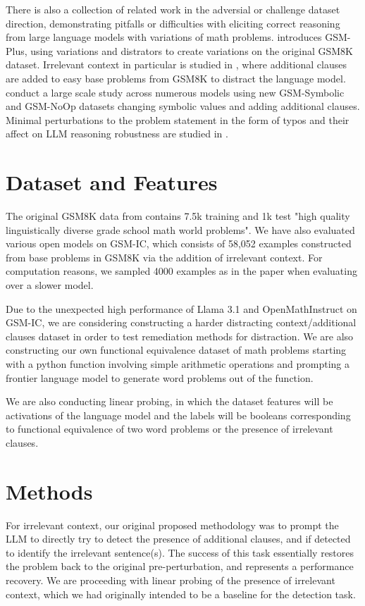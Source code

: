 \documentclass{article}
\begin{document}
There is also a collection of related work in the adversial or challenge dataset direction, demonstrating pitfalls or difficulties with eliciting correct reasoning from large language models with variations of math problems. \citep{li} introduces GSM-Plus, using variations and distrators to create variations on the original GSM8K dataset. Irrelevant context in particular is studied in \citep{shi}, where additional clauses are added to easy base problems from GSM8K to distract the language model. \citep{mirzadeh} conduct a large scale study across numerous models using new GSM-Symbolic and GSM-NoOp datasets changing symbolic values and adding additional clauses. Minimal perturbations to the problem statement in the form of typos and their affect on LLM reasoning robustness are studied in \citep{gan}.

\section{Dataset and Features}

The original GSM8K data from \citep{cobbe} contains 7.5k training and 1k test "high quality linguistically diverse grade school math world problems". We have also evaluated various open models on GSM-IC, which consists of 58,052 examples constructed from base problems in GSM8K via the addition of irrelevant context. For computation reasons, we sampled 4000 examples as in the paper \citep{shi} when evaluating over a slower model.

Due to the unexpected high performance of Llama 3.1 and OpenMathInstruct on GSM-IC, we are considering constructing a harder distracting context/additional clauses dataset in order to test remediation methods for distraction. We are also constructing our own functional equivalence dataset of math problems starting with a python function involving simple arithmetic operations and prompting a frontier language model to generate word problems out of the function.

We are also conducting linear probing, in which the dataset features will be activations of the language model and the labels will be booleans corresponding to functional equivalence of two word problems or the presence of irrelevant clauses.

\section{Methods}
For irrelevant context, our original proposed methodology was to prompt the LLM to directly try to detect the presence of additional clauses, and if detected to identify the irrelevant sentence(s). The success of this task essentially restores the problem back to the original pre-perturbation, and represents a performance recovery. We are proceeding with linear probing of the presence of irrelevant context, which we had originally intended to be a baseline for the detection task.
\end{document}
